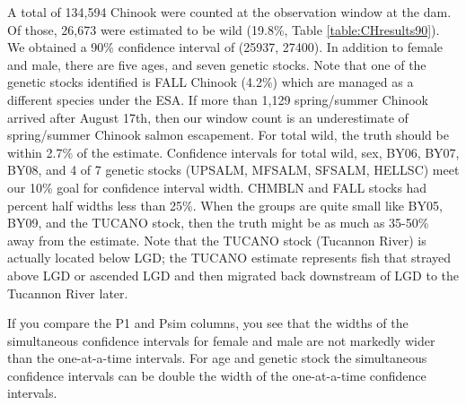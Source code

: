 \documentclass[11pt]{article}
\begin{document}
A total of 134,594 Chinook were counted at the observation window at the dam. Of those, 26,673 were estimated to be wild (19.8\%, Table \ref{table:CHresults90}). We obtained a 90\% confidence interval of (25937, 27400). In addition to female and male, there are five ages, and seven genetic stocks. Note that one of the genetic stocks identified is FALL Chinook (4.2\%) which are managed as a different species under the ESA. If more than 1,129 spring/summer Chinook arrived after August 17th, then our window count is an underestimate of spring/summer Chinook salmon escapement. For total wild, the truth should be within 2.7\% of the estimate.  Confidence intervals for total wild, sex, BY06, BY07, BY08, and 4 of 7 genetic stocks (UPSALM, MFSALM, SFSALM, HELLSC) meet our 10\% goal for confidence interval width. CHMBLN and FALL stocks had percent half widths less than 25\%. When the groups are quite small like BY05, BY09, and the TUCANO stock, then the truth might be as much as 35-50\% away from the estimate. Note that the TUCANO stock (Tucannon River) is actually located below LGD; the TUCANO estimate represents fish that strayed above LGD or ascended LGD and then migrated back downstream of LGD to the Tucannon River later. 

If you compare the P1 and Psim columns, you see that the widths of the simultaneous confidence intervals for female and male are not markedly wider than the one-at-a-time intervals. For age and genetic stock the simultaneous confidence intervals can be double the width of the one-at-a-time confidence intervals.
\end{document}

